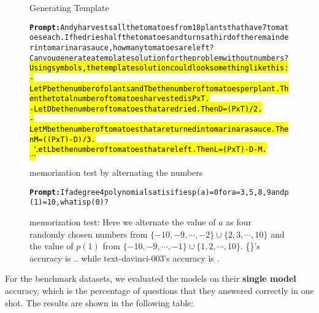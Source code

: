 \begin{figure}[H]
\begin{AIbox}{{\DV} Generating Template}\vspace{-5px}
\parbox{1\textwidth}{\scriptsize\begin{alltt} 
{\bf Prompt:} Andy harvests all the tomatoes from 18 plants that have 7 tomatoes each. If he dries half the tomatoes and turns a third of the remainder into marinara sauce, how many tomatoes are left?\\
Can you generate a template solution for the problem without numbers?\\

\hl{Using symbols, the template solution could look something like this:\\
- Let P be the number of plants and T be the number of tomatoes per plant. Then the total number of tomatoes harvested is P x T.\\
- Let D be the number of tomatoes that are dried. Then D = (P x T) / 2.\\
- Let M be the number of tomatoes that are turned into marinara sauce. Then M = ((P x T) - D) / 3.\\
- Let L be the number of tomatoes that are left. Then L = (P x T) - D - M.\\
$\cdots$}\end{alltt}}\vspace{-5px}
\end{AIbox}
\end{figure}


\begin{figure}[H]
\begin{AIbox}{{\DV} memorization test by alternating the numbers}\vspace{-5px}
\parbox{1\textwidth}{\scriptsize\begin{alltt} 
{\bf Prompt:} If a degree 4 polynomial satisifies p(a) = 0 for a = 3, 5, 8, 9 and p(1) = 10, what is p(0)? \end{alltt}}\vspace{-5px}
\end{AIbox}
\caption{\DV memorization test: Here we alternate the value of $a$ as four randomly chosen numbers from $\{-10, -9, \cdots, -2 \} \cup \{2, 3, \cdots, 10 \}$ and the value of $p(1)$ from $\{-10, -9 ,\cdots, -1 \} \cup \{1, 2, \cdots, 10\}$. \{\DV\}'s accuracy is .. while text-davinci-003's accuracy is .}
\end{figure}

For the benchmark datasets, we evaluated the models on their \textbf{single model} accuracy, which is the percentage of questions that they answered correctly in one shot. The results are shown in the following table:

